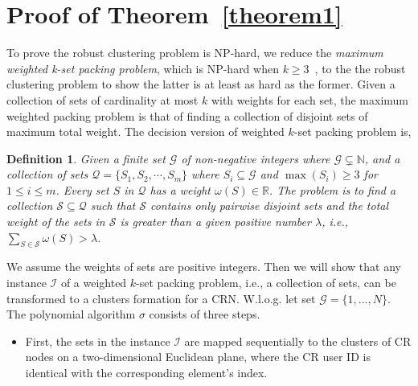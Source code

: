 \documentclass[10pt,journal,compsoc]{IEEEtran}
\makeatletter
\theoremstyle{mytheoremstyle}
\theoremstyle{mytheoremstyle}
\theoremstyle{mytheoremstyle}
\newtheorem{mydef}{Definition}%
\renewenvironment{proof}[1][\proofname]{%
      \par\pushQED{\qed}\fontfamily{ptm}\selectfont%
      \topsep6\p@\@plus6\p@\relax
      \trivlist\item[\hskip\labelsep\bfseries#1\@addpunct{.}]%
      \ignorespaces
    }{%
      \popQED\endtrivlist\@endpefalse
    }
\newcommand{\ie}{i.e., }
\makeatother
\begin{document}
\section{Proof of Theorem~\ref{theorem1}}
\label{proof_theorem1}
\begin{proof}
To prove the robust clustering problem is NP-hard, we reduce the \textit{maximum weighted k-set packing problem}, which is NP-hard when $k\geqslant 3$~\cite{Computers_a_Intractability}, to the the robust clustering problem to show the latter is at least as hard as the former.
Given a collection of sets of cardinality at most $k$ with weights for each set, the maximum weighted packing problem is that of finding a collection of disjoint sets of maximum total weight.
The decision version of weighted $k$-set packing problem is,
\begin{mydef}
\label{def_kset_packing}
Given a finite set $\mathcal{G}$ of non-negative integers where $\mathcal{G} \subsetneq \mathbb{N}$, and a collection of sets $\mathcal{Q}=\{S_1,S_2,\cdots,S_m\}$ where $S_i \subseteq \mathcal{G}$ and $\max(S_i)\geq 3$ for $1 \leq i \leq m$.
Every set $S$ in $\mathcal{Q}$ has a weight $\omega(S) \in \mathbb{R}$. 
%
The problem is to find a collection $\mathcal{S} \subseteq \mathcal{Q}$ such that $\mathcal{S}$ contains only pairwise disjoint sets and the total weight of the sets in $\mathcal{S}$ is greater than a given positive number $\lambda$, i.e., $\sum_{S \in \mathcal{S}} \omega(S) > \lambda$.
\end{mydef}

We assume the weights of sets are positive integers.
Then we will show that any instance $\mathcal{I}$ of a weighted $k$-set packing problem, \ie a collection of sets, can be transformed to a clusters formation for a CRN.
W.l.o.g. let set $\mathcal{G} = \{ 1, \ldots , N \}$.
The polynomial algorithm $\sigma$ consists of three steps.

\begin{itemize}


\item First, the sets in the instance $\mathcal{I}$ are mapped sequentially to the clusters of CR nodes on a two-dimensional Euclidean plane, where the CR user ID is identical with the corresponding element's index.


\end{itemize}
\end{proof}
\end{document}
